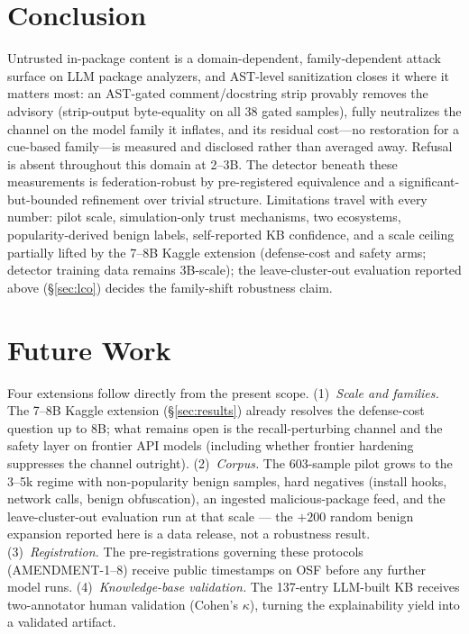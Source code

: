 \documentclass[sigconf,nonacm]{acmart}
\begin{document}
\section{Conclusion}\label{sec:conclusion}
Untrusted in-package content is a domain-dependent, family-dependent
attack surface on LLM package analyzers, and AST-level sanitization
closes it where it matters most: an AST-gated comment/docstring strip
provably removes the advisory (strip-output byte-equality on all $38$
gated samples), fully neutralizes the channel on the model family it
inflates, and its residual cost---no restoration for a cue-based
family---is measured and disclosed rather than averaged away. Refusal is
absent throughout this domain at 2--3B. The detector beneath these
measurements is federation-robust by pre-registered equivalence and a
significant-but-bounded refinement over trivial structure. Limitations
travel with every number: pilot scale, simulation-only trust mechanisms,
two ecosystems, popularity-derived benign labels, self-reported KB
confidence, and a scale ceiling partially lifted by the 7--8B Kaggle extension
(defense-cost and safety arms; detector training data remains 3B-scale);
the leave-cluster-out
evaluation reported above (\S\ref{sec:lco}) decides the family-shift
robustness claim.

\section*{Future Work}\label{sec:future}
Four extensions follow directly from the present scope.
(1)~\emph{Scale and families.} The 7--8B Kaggle extension
(\S\ref{sec:results}) already resolves the defense-cost question up to
8B; what remains open is the recall-perturbing channel and the safety
layer on frontier API models (including whether frontier hardening
suppresses the channel outright).
(2)~\emph{Corpus.} The 603-sample pilot grows to the 3--5k regime with
non-popularity benign samples, hard negatives (install hooks, network
calls, benign obfuscation), an ingested malicious-package feed, and the
leave-cluster-out evaluation run at that scale --- the ${+}200$ random
benign expansion reported here is a data release, not a robustness
result. (3)~\emph{Registration.} The pre-registrations governing these
protocols (AMENDMENT-1--8) receive public timestamps on OSF before any
further model runs. (4)~\emph{Knowledge-base validation.} The
137-entry LLM-built KB receives two-annotator human validation
(Cohen's $\kappa$), turning the explainability yield into a validated
artifact.
\end{document}
